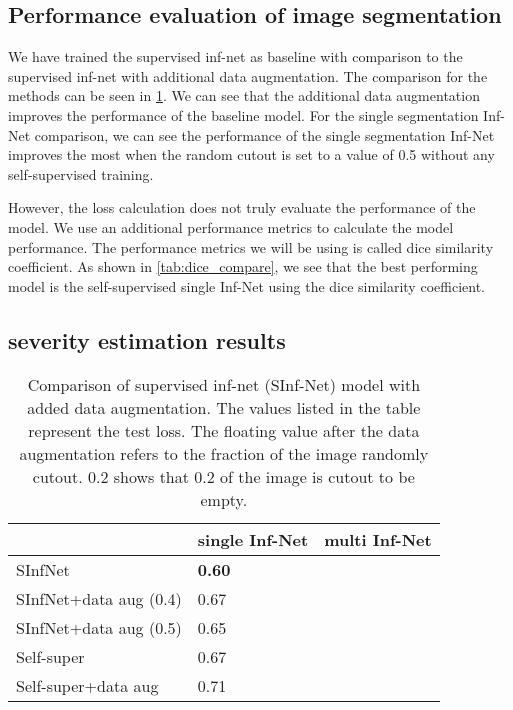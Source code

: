 \subsection{Performance evaluation of image segmentation}
We have trained the supervised inf-net as baseline with comparison to the supervised inf-net with additional data augmentation. The comparison for the methods can be seen in \ref{tab:table_compare}. We can see that the additional data augmentation improves the performance of the baseline model. For the single segmentation Inf-Net comparison, we can see the performance of the single segmentation Inf-Net improves the most when the random cutout is set to a value of 0.5 without any self-supervised training. 

However, the loss calculation does not truly evaluate the performance of the model. We use an additional performance metrics to calculate the model performance. The performance metrics we will be using is called dice similarity coefficient. As shown in \ref{tab:dice_compare}, we see that the best performing model is the self-supervised single Inf-Net using the dice similarity coefficient. 

\subsection{severity estimation results}


\begin{table}
	\centering

	\begin{tabular}{|l|l|l|}
		\hline
		& single Inf-Net & multi Inf-Net \\\hline
		SInfNet & \textbf{0.60} &  \\\hline
		SInfNet+data aug (0.4)& 0.67 &  \\\hline
		SInfNet+data aug (0.5)& 0.65 & \textbf{} \\\hline
		Self-super & 0.67 & \\\hline
		Self-super+data aug & 0.71 & \\
		\hline
		
	\end{tabular}
	\caption{Comparison of supervised inf-net (SInf-Net) model with added data augmentation. The values listed in the table represent the test loss. The floating value  after the data augmentation refers to the fraction of the image randomly cutout. 0.2 shows that 0.2 of the image is cutout to be empty. }
	\label{tab:table_compare}
\end{table}

